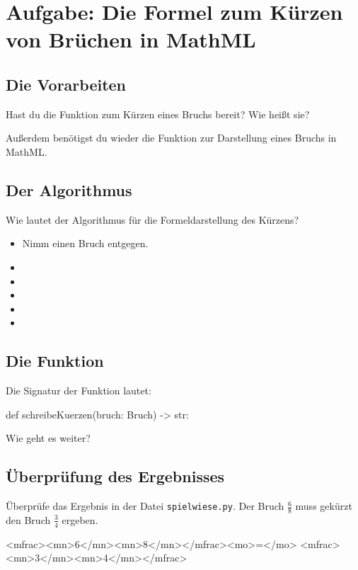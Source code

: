 \section{Aufgabe: Die Formel zum Kürzen von Brüchen in MathML}

\subsection*{Die Vorarbeiten}

Hast du die Funktion zum Kürzen eines Bruchs bereit? Wie heißt sie?

Außerdem benötigst du wieder die Funktion zur Darstellung eines Bruchs in MathML.

\subsection*{Der Algorithmus}

Wie lautet der Algorithmus für die Formeldarstellung des Kürzens?

{\Large
	\begin{itemize}
		\item Nimm einen Bruch entgegen. 
		\item  
		\item  
		\item  
		\item  
		\item  
	\end{itemize}
}


\subsection*{Die Funktion}

Die Signatur der Funktion lautet:

\begin{codePython}
def schreibeKuerzen(bruch: Bruch) -> str:
\end{codePython}

Wie geht es weiter?

\subsection*{Überprüfung des Ergebnisses}

Überprüfe das Ergebnis in der Datei \texttt{spielwiese.py}. Der Bruch $\frac{6}{8}$ muss gekürzt den Bruch $\frac{3}{4}$ ergeben.

\begin{codeHTML}
<mfrac><mn>6</mn><mn>8</mn></mfrac><mo>=</mo>
	<mfrac><mn>3</mn><mn>4</mn></mfrac>
\end{codeHTML}


